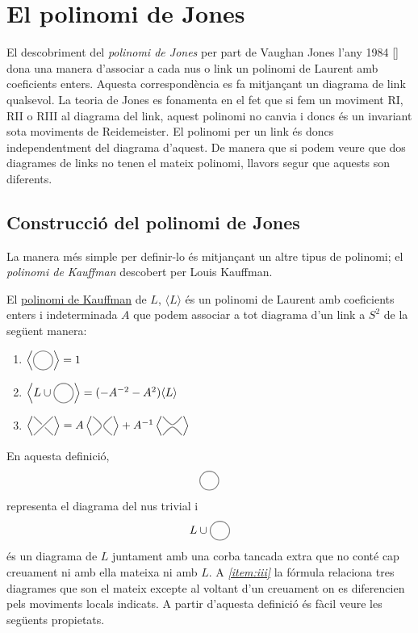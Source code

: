 
\section{El polinomi de Jones}\label{sec:El polinomi de Jones}

El descobriment del \textit{polinomi de Jones} per part de Vaughan Jones l'any 1984 [\cite{jonesoriginal}] dona una manera d'associar a cada nus o link un polinomi de Laurent amb coeficients enters. Aquesta correspondència es fa mitjançant un diagrama de link qualsevol. La teoria de Jones es fonamenta en el fet que si fem un moviment RI, RII o RIII al diagrama del link, aquest polinomi no canvia i doncs és un invariant sota moviments de Reidemeister. El polinomi per un link és doncs independentment del diagrama d'aquest. De manera que si podem veure que dos diagrames de links no tenen el mateix polinomi, llavors segur que aquests son diferents.\\

\subsection{Construcció del polinomi de Jones}

La manera més simple per definir-lo és mitjançant un altre tipus de polinomi; el \textit{polinomi de Kauffman} descobert per Louis Kauffman.\\

\begin{definition}
	El \underline{polinomi de Kauffman} de $L$, $\langle L\rangle$ és un polinomi de Laurent amb coeficients enters i indeterminada $A$ que podem associar a tot diagrama d'un link a $S^2$ de la següent manera:
	\begin{enumerate}
		\item\label{item:i} $\left\langle\KPA\right\rangle=1$
		\item\label{item:ii} $\left\langle L \cup \KPA\right\rangle=(-A^{-2}-A^{2})\langle L\rangle$
		\item\label{item:iii} $\left\langle\KPB\right\rangle=
		A\left\langle\KPC\right\rangle + A^{-1} \left\langle \KPD \right\rangle$
	\end{enumerate}
\end{definition}

En aquesta definició, $$\KPA$$ representa el diagrama del nus trivial i $$L \cup \KPA$$ és un diagrama de $L$ juntament amb una corba tancada extra que no conté cap creuament ni amb ella mateixa ni amb $L$. A \textit{\ref{item:iii}} la fórmula relaciona tres diagrames que son el mateix excepte al voltant d'un creuament on es diferencien pels moviments locals indicats. A partir d'aquesta definició és fàcil veure les següents propietats.

